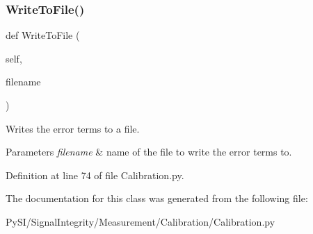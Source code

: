 \subsubsection{\texorpdfstring{Write\+To\+File()}{WriteToFile()}}
{\footnotesize\ttfamily def Write\+To\+File (\begin{DoxyParamCaption}\item[{}]{self,  }\item[{}]{filename }\end{DoxyParamCaption})}



Writes the error terms to a file. 


\begin{DoxyParams}{Parameters}
{\em filename} & name of the file to write the error terms to. \\
\hline
\end{DoxyParams}


Definition at line 74 of file Calibration.\+py.



The documentation for this class was generated from the following file\+:\begin{DoxyCompactItemize}
\item 
Py\+S\+I/\+Signal\+Integrity/\+Measurement/\+Calibration/Calibration.\+py\end{DoxyCompactItemize}
